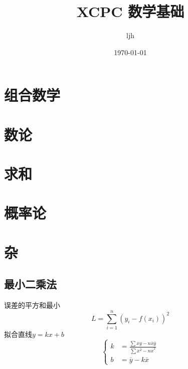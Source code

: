 \documentclass[12pt, a4paper, oneside]{ctexbook}
\title{{\Huge{\textbf{XCPC 数学基础}}}}
\author{ljh}
\date{\today}
\begin{document}
\maketitle

\setcounter{page}{1}

\newpage
{}
\setcounter{page}{1}
\tableofcontents
\newpage
\setcounter{page}{1}

\chapter{组合数学}


\chapter{数论}


\chapter{求和}




\chapter{概率论}



\chapter{杂}
\section{最小二乘法}
误差的平方和最小\\
$$
  L=\sum_{i=1}^{n} (y_i-f(x_i))^2
$$
拟合直线$y=kx+b$ 
$$
  \begin{cases}
    k&=\frac{\sum xy- n \overline{x}\overline{y}}{\sum x^2-n\overline{x}^2}\\
    b&=\overline{y}-k\overline{x}
  \end{cases}
$$
\end{document}
